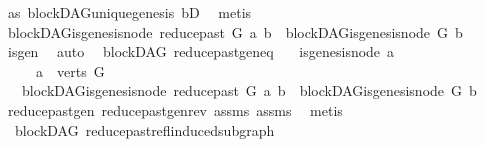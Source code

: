 \begin{isabellebody}
\ as{}\ blockDAG{\isachardot}{\kern0pt}unique{\isacharunderscore}{\kern0pt}genesis\ bD\ \isamarkupfalse%
\ metis\isanewline
\ \ \isamarkupfalse%
\ \isamarkupfalse%
\ {\isachardoublequoteopen}blockDAG{\isachardot}{\kern0pt}is{\isacharunderscore}{\kern0pt}genesis{\isacharunderscore}{\kern0pt}node\ {\isacharparenleft}{\kern0pt}reduce{\isacharunderscore}{\kern0pt}past\ G\ a{\isacharparenright}{\kern0pt}\ b\ {\isasymLongrightarrow}\ blockDAG{\isachardot}{\kern0pt}is{\isacharunderscore}{\kern0pt}genesis{\isacharunderscore}{\kern0pt}node\ G\ b{\isachardoublequoteclose}\isanewline
\ \ \ \ \isamarkupfalse%
\ is{\isacharunderscore}{\kern0pt}gen\ \isamarkupfalse%
\ auto\isanewline
{}\isamarkupfalse%
%
\endisatagproof
{\isafoldproof}%
%
\isadelimproof
\isanewline
%
\endisadelimproof
\isanewline
{}\isamarkupfalse%
\ {\isacharparenleft}{\kern0pt}\ blockDAG{\isacharparenright}{\kern0pt}\ reduce{\isacharunderscore}{\kern0pt}past{\isacharunderscore}{\kern0pt}gen{\isacharunderscore}{\kern0pt}eq{\isacharcolon}{\kern0pt}\isanewline
\ \ \ {\isachardoublequoteopen}{\isasymnot}is{\isacharunderscore}{\kern0pt}genesis{\isacharunderscore}{\kern0pt}node\ a{\isachardoublequoteclose}\ \isanewline
\ \ \ \ \ {\isachardoublequoteopen}a\ {\isasymin}\ verts\ G{\isachardoublequoteclose}\isanewline
\ \ \ {\isachardoublequoteopen}blockDAG{\isachardot}{\kern0pt}is{\isacharunderscore}{\kern0pt}genesis{\isacharunderscore}{\kern0pt}node\ {\isacharparenleft}{\kern0pt}reduce{\isacharunderscore}{\kern0pt}past\ G\ a{\isacharparenright}{\kern0pt}\ b\ {\isacharequal}{\kern0pt}\ blockDAG{\isachardot}{\kern0pt}is{\isacharunderscore}{\kern0pt}genesis{\isacharunderscore}{\kern0pt}node\ G\ b{\isachardoublequoteclose}\isanewline
%
\isadelimproof
\ \ %
\endisadelimproof
%
\isatagproof
{}\isamarkupfalse%
\ reduce{\isacharunderscore}{\kern0pt}past{\isacharunderscore}{\kern0pt}gen\ reduce{\isacharunderscore}{\kern0pt}past{\isacharunderscore}{\kern0pt}gen{\isacharunderscore}{\kern0pt}rev\ assms\ assms\ \isamarkupfalse%
\ metis%
\endisatagproof
{\isafoldproof}%
%
\isadelimproof
%
\endisadelimproof
%
\isadelimdocument
%
\endisadelimdocument
%
\isatagdocument
%
\isamarkuptrue%
%
\endisatagdocument
{\isafolddocument}%
%
\isadelimdocument
%
\endisadelimdocument
{}\isamarkupfalse%
\ {\isacharparenleft}{\kern0pt}\ blockDAG{\isacharparenright}{\kern0pt}\ reduce{\isacharunderscore}{\kern0pt}past{\isacharunderscore}{\kern0pt}refl{\isacharunderscore}{\kern0pt}induced{\isacharunderscore}{\kern0pt}subgraph{\isacharcolon}{\kern0pt}\isanewline

\end{isabellebody}
